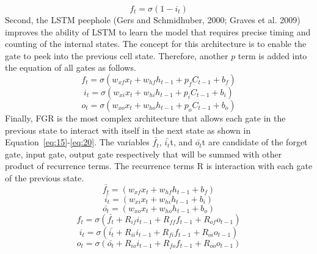\begin{equation}
f_t  = \sigma(1-i_t)
\label{eq:11}
\end{equation}
Second, the LSTM peephole (Gers and Schmidhuber, 2000; Graves et al. 2009)
\cite{gers2000recurrent,graves2009novel}
improves the ability of LSTM to learn the model that requires 
precise timing and counting of the internal states.
The concept for this architecture is to enable the gate to peek
into the previous cell state. 
Therefore, another $p$ term is added into the equation of all gates as follows.
\begin{equation}
f_t=\sigma(w_{xf}x_t+w_{hf}h_{t-1}+p_fC_{t-1}+b_f)
\label{eq:12}
\end{equation}
\begin{equation}
i_t=\sigma(w_{xi}x_t+w_{hi}h_{t-1}+p_iC_{t-1}+b_i)
\label{eq:13}
\end{equation}
\begin{equation}
o_t=\sigma(w_{xo}x_t+w_{ho}h_{t-1}+p_oC_{t-1}+b_o)
\label{eq:14}
\end{equation}
Finally, FGR is the most complex architecture that allows each gate in the previous
state to interact with itself in the next state as shown in
Equation~\ref{eq:15}-\ref{eq:20}.
The variables $\bar{f_t}$, $\bar{i_t}$t, and $\bar{o_t}$t are candidate 
of the forget gate, input gate, output gate respectively
that will be summed with other product of recurrence terms.
The recurrence terms R is interaction with each gate of the previous state.
\begin{equation}
\bar{f_t}=(w_{xf}x_t+w_{hf}h_{t-1}+b_f)
\label{eq:15}
\end{equation}
\begin{equation}
\bar{i_t}=(w_{xi}x_t+w_{hi}h_{t-1}+b_i)
\label{eq:16}
\end{equation}
\begin{equation}
\bar{o_t}=(w_{xo}x_t+w_{ho}h_{t-1}+b_o)
\label{eq:17}
\end{equation}
\begin{equation}
f_t = \sigma(\bar{f_t}+R_{if}i_{t-1}+R_{ff}f_{t-1}+R_{of}o_{t-1})
\label{eq:18}
\end{equation}
\begin{equation}
i_t = \sigma(\bar{i_t}+R_{ii}i_{t-1}+R_{fi}f_{t-1}+R_{oi}o_{t-1})
\label{eq:19}
\end{equation}
\begin{equation}
o_t = \sigma(\bar{o_t}+R_{io}i_{t-1}+R_{fo}f_{t-1}+R_{oo}o_{t-1})
\label{eq:20}
\end{equation}

